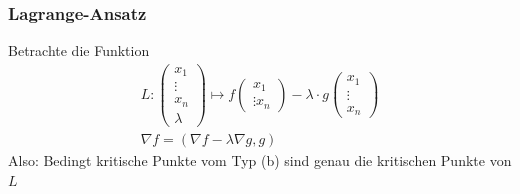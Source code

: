 \subsubsection{Lagrange-Ansatz}
Betrachte die Funktion
\begin{gather*}
	L: \begin{pmatrix} x_1 \\ \vdots \\ x_n \\ \lambda \end{pmatrix} \mapsto f\begin{pmatrix} x_1 \\ \vdots x_n \end{pmatrix} - \lambda \cdot g\begin{pmatrix} x_1 \\ \vdots \\ x_n \end{pmatrix} \\
	\nabla f = ( \nabla f - \lambda\nabla g , g )
\end{gather*}
Also: Bedingt kritische Punkte vom Typ (b)  sind genau die kritischen Punkte von $L$
